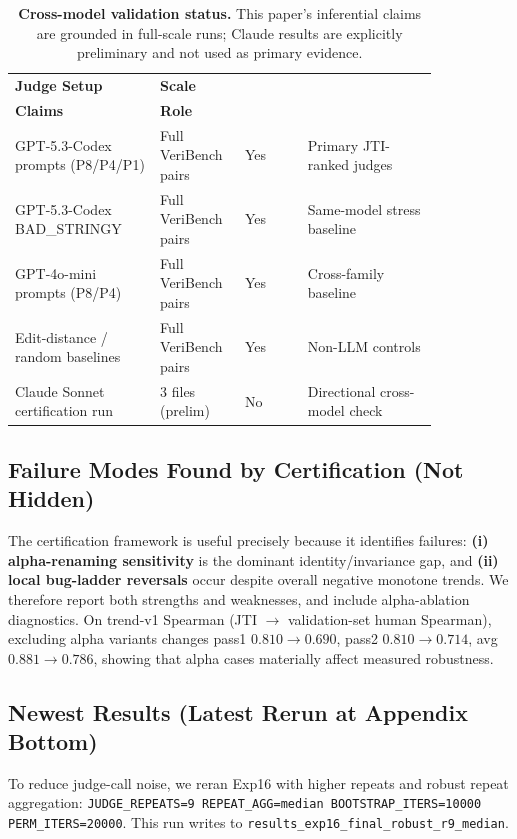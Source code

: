 \documentclass{article}
\begin{document}
\begin{table}[t]
  \centering
  \small
  \begin{tabular}{@{}p{0.30\linewidth}p{0.14\linewidth}p{0.13\linewidth}p{0.27\linewidth}@{}}
    \toprule
    \textbf{Judge Setup}             & \textbf{Scale}       & \makecell[c]{\textbf{In Main}                                 \\\textbf{Claims}} & \textbf{Role} \\
    \midrule
    GPT-5.3-Codex prompts (P8/P4/P1) & Full VeriBench pairs & Yes                           & Primary JTI-ranked judges     \\
    GPT-5.3-Codex BAD\_STRINGY       & Full VeriBench pairs & Yes                           & Same-model stress baseline    \\
    GPT-4o-mini prompts (P8/P4)      & Full VeriBench pairs & Yes                           & Cross-family baseline         \\
    Edit-distance / random baselines & Full VeriBench pairs & Yes                           & Non-LLM controls              \\
    Claude Sonnet certification run  & 3 files (prelim)     & No                            & Directional cross-model check \\
    \bottomrule
  \end{tabular}
  \caption{\textbf{Cross-model validation status.}
    This paper's inferential claims are grounded in full-scale runs; Claude results are explicitly preliminary and not used as primary evidence.}
  \label{tab:app-cross-model-status}
\end{table}

\subsection{Failure Modes Found by Certification (Not Hidden)}
The certification framework is useful precisely because it identifies failures:
\textbf{(i) alpha-renaming sensitivity} is the dominant identity/invariance gap,
and \textbf{(ii) local bug-ladder reversals} occur despite overall negative monotone trends.
We therefore report both strengths and weaknesses, and include alpha-ablation diagnostics.
On trend-v1 Spearman (JTI \(\rightarrow\) validation-set human Spearman), excluding alpha variants changes
pass1 \(0.810\rightarrow0.690\), pass2 \(0.810\rightarrow0.714\), avg \(0.881\rightarrow0.786\),
showing that alpha cases materially affect measured robustness.

\subsection{Newest Results (Latest Rerun at Appendix Bottom)}
To reduce judge-call noise, we reran Exp16 with higher repeats and robust repeat aggregation:
\texttt{JUDGE\_REPEATS=9 REPEAT\_AGG=median BOOTSTRAP\_ITERS=10000 PERM\_ITERS=20000}.
This run writes to \texttt{results\_exp16\_final\_robust\_r9\_median}.
\end{document}

